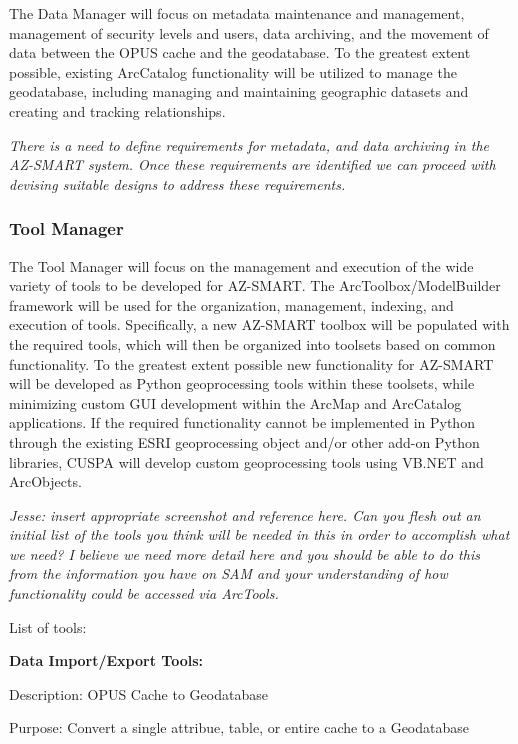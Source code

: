 The Data Manager will focus on metadata maintenance and management, management of security levels and users, data archiving, and the movement of data between the OPUS cache and the geodatabase.  To the greatest extent possible, existing ArcCatalog functionality will be utilized to manage the geodatabase, including managing and maintaining geographic datasets and creating and tracking relationships.

\emph{There is a need to define requirements for metadata, and data archiving in the AZ-SMART system.  Once these requirements are identified we can proceed with devising suitable designs to address these requirements.}

\subsubsection{Tool Manager}

The Tool Manager will focus on the management and execution of the wide variety of tools to be developed for AZ-SMART.  The ArcToolbox/ModelBuilder framework will be used for the organization, management, indexing, and execution of tools.  Specifically, a new AZ-SMART toolbox will be populated with the required tools, which will then be organized into toolsets based on common functionality.  To the greatest extent possible new functionality for AZ-SMART will be developed as Python geoprocessing tools within these toolsets, while minimizing custom GUI development within the ArcMap and ArcCatalog applications.  If the required functionality cannot be implemented in Python through the existing ESRI geoprocessing object and/or other add-on Python libraries, CUSPA will develop custom geoprocessing tools using VB.NET and ArcObjects.

\emph{Jesse: insert appropriate screenshot and reference here.  Can you flesh out an initial list of the tools you think will be needed in this in order to accomplish what we need?  I believe we need more detail here and you should be able to do this from the information you have on SAM and your understanding of how functionality could be accessed via ArcTools.}

\bigskip

List of tools:

\bigskip

\textbf{Data Import/Export Tools:}

\bigskip

Description: OPUS Cache to Geodatabase

Purpose: Convert a single attribue, table, or entire cache to a Geodatabase

